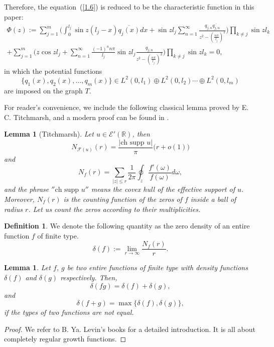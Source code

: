 \documentclass[10pt,a4paper]{article}
\theoremstyle{plain}
\newtheorem{lemma}[theorem]{Lemma}
\theoremstyle{definition}
\newtheorem{definition}[theorem]{Definition}
\theoremstyle{remark}
\numberwithin{equation}{section}
\begin{document}
Therefore, the equation~(\ref{1.6}) is reduced to be the characteristic function in this paper:
\begin{eqnarray}\nonumber
\Phi(z):=\sum_{j=1}^{m}\Big(\int_{0}^{l_{j}}\sin{z(l_{j}-x)}\overline{q_{j}(x)}dx+\sin{z l_{j}}\sum_{n=1}^{\infty}\frac{q_{j,n}\overline{q_{j,n}}}{z^{2}-(\frac{n\pi}{l_{j}})^{2}}\Big)\prod_{k\neq j}\sin{z l_{k}}\\
+\sum_{j=1}^{m}\Big(z\cos{z l_{j}}+\sum_{n=1}^{\infty}\frac{(-1)^{n}n\pi}{l_{j}}\sin{z l_{j}}\frac{q_{j,n}}{z^{2}-(\frac{n\pi}{l_{j}})^{2}}\Big)\prod_{k\neq j}\sin{z l_{k}}=0,\label{Phi}
\end{eqnarray}
in which the potential functions $$\{q_{1}(x),q_{2}(x),\ldots,q_{m}(x)\}\in L^{2}(0,l_{1})\oplus L^{2}(0,l_{2})\cdots\oplus L^{2}(0,l_{m})$$are imposed on the graph $T$. 
\par
For reader's convenience, we include the following classical lemma proved by E. C. Titchmarsh, and a modern proof can be found in \cite{Tang}.
\begin{lemma}[Titchmarsh]\label{L2.1}
Let $u\in\mathcal{E}'(\mathbb{R})$, then
$$N_{\mathcal{F}(u)}(r)= \frac{|\mbox{ch supp } u|}{\pi}\big(r + o(1)\big)$$ and $$N_{f}(r)=\sum_{|z|\leq r}\frac{1}{2\pi}\oint_{z}\frac{f'(\omega)}{f(\omega)}d\omega,$$
and the phrase $''\mbox{ch supp }u''$ means the covex hull of the effective support of $u$. Moreover, $N_{f}(r)$ is the counting function of the zeros of $f$ inside a ball of radius $r$. Let us count the zeros according to their multiplicities.
\end{lemma}
\begin{definition}
We denote the following quantity as the zero density of an entire function $f$ of finite type.
\begin{equation}
\delta(f):=\lim_{r\rightarrow\infty}\frac{N_{f}(r)}{r}.
\end{equation}
\end{definition}
\begin{lemma}\label{L2.3}
Let $f$, $g$ be two entire functions of finite type with density functions $\delta(f)$ and
$\delta(g)$ respectively. Then, 
\begin{equation}\nonumber
\delta(fg)=\delta(f)+\delta(g),
\end{equation}
and
\begin{equation}
\delta(f+g)=\max\{\delta(f),\delta(g)\},\label{220}
\end{equation}if the types of two functions are not equal.
\end{lemma}
\begin{proof}
We refer to B. Ya. Levin's books \cite[p.\,52]{Levin,Levin2} for a detailed introduction.  It is all about completely regular growth functions.


\end{proof}
\end{document}
